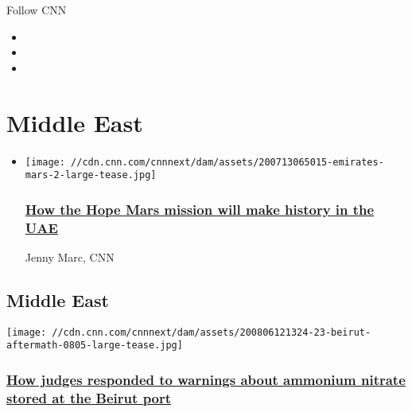 Follow CNN

\begin{itemize}
\item
\item
\item
\end{itemize}

\hypertarget{middle-east}{%
\section{Middle East}\label{middle-east}}

\begin{itemize}
\item
  \href{/2020/07/14/middleeast/uae-mars-mission-hope-scn-spc-intl/index.html}{}

  \texttt{[image: //cdn.cnn.com/cnnnext/dam/assets/200713065015-emirates-mars-2-large-tease.jpg]}

  \hypertarget{how-the-hope-mars-mission-will-make-history-in-the-uae}{%
  \subsubsection{\texorpdfstring{\href{/2020/07/14/middleeast/uae-mars-mission-hope-scn-spc-intl/index.html}{How
  the Hope Mars mission will make history in the
  UAE}}{How the Hope Mars mission will make history in the UAE}}\label{how-the-hope-mars-mission-will-make-history-in-the-uae}}

  Jenny Marc, CNN
\end{itemize}

\hypertarget{middle-east-1}{%
\subsection{Middle East}\label{middle-east-1}}

\href{/2020/08/06/middleeast/lebanon-explosion-ministry-of-justice-intl/index.html}{}

\texttt{[image: //cdn.cnn.com/cnnnext/dam/assets/200806121324-23-beirut-aftermath-0805-large-tease.jpg]}

\hypertarget{how-judges-responded-to-warnings-about-ammonium-nitrate-stored-at-the-beirut-port}{%
\subsubsection{\texorpdfstring{\href{/2020/08/06/middleeast/lebanon-explosion-ministry-of-justice-intl/index.html}{How
judges responded to warnings about ammonium nitrate stored at the Beirut
port}}{How judges responded to warnings about ammonium nitrate stored at the Beirut port}}\label{how-judges-responded-to-warnings-about-ammonium-nitrate-stored-at-the-beirut-port}}

